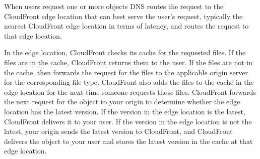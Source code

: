 When users request one or more objects DNS routes the request to the CloudFront edge location that can best serve the user's request, typically the nearest CloudFront edge location in terms of latency, and routes the request to that edge location.

In the edge location, CloudFront checks its cache for the requested files. If the files are in the cache, CloudFront returns them to the user. If the files are not in the cache, then forwards the request for the files to the applicable origin server for the corresponding file type.
CloudFront also adds the files to the cache in the edge location for the next time someone requests those files.
CloudFront forwards the next request for the object to your origin to determine whether the edge location has the latest version.
If the version in the edge location is the latest, CloudFront delivers it to your user.
If the version in the edge location is not the latest, your origin sends the latest version to CloudFront, and CloudFront delivers the object to your user and stores the latest version in the cache at that edge location.